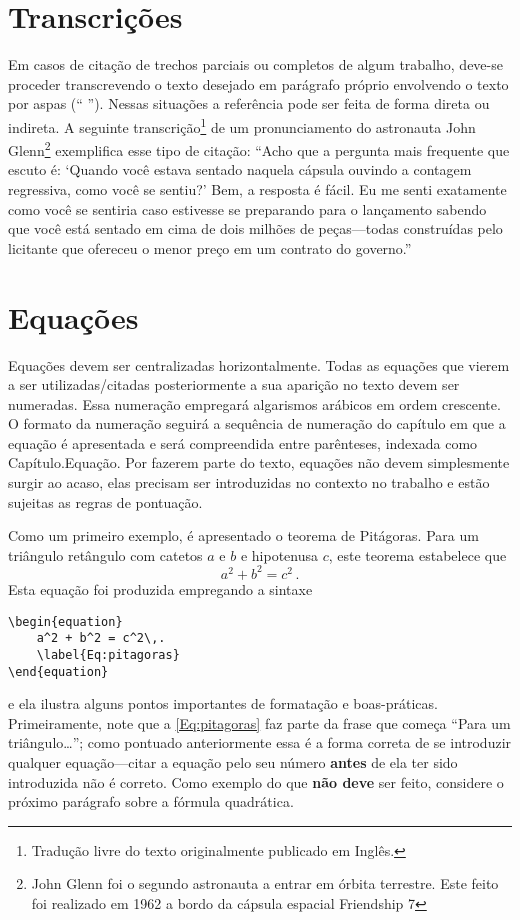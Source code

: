 \section{Transcrições}
Em casos de citação de trechos parciais ou completos de algum trabalho, deve-se proceder transcrevendo o texto desejado em parágrafo próprio envolvendo o texto por aspas (`` ''). Nessas situações a referência pode ser feita de forma direta ou indireta. A seguinte transcrição\footnote{Tradução livre do texto originalmente publicado em Inglês.} de um pronunciamento do astronauta John Glenn\footnote{John Glenn foi o segundo astronauta a entrar em órbita terrestre. Este feito foi realizado em 1962 a bordo da cápsula espacial Friendship 7} exemplifica esse tipo de citação:
``Acho que a pergunta mais frequente que escuto é: `Quando você estava sentado naquela cápsula ouvindo a contagem regressiva, como você se sentiu?' Bem, a resposta é fácil. Eu me senti exatamente como você se sentiria caso estivesse se preparando para o lançamento sabendo que você está sentado em cima de dois milhões de peças---todas construídas pelo licitante que ofereceu o menor preço em um contrato do governo.'' \citep{kranz2009failure}

\section{Equações}
Equações devem ser centralizadas horizontalmente. Todas as equações que vierem a ser utilizadas/citadas posteriormente a sua aparição no texto devem ser numeradas. Essa numeração empregará algarismos arábicos em ordem crescente. O formato da numeração seguirá a sequência de numeração do capítulo em que a equação é apresentada e será compreendida entre parênteses, indexada como Capítulo.Equação. Por fazerem parte do texto, equações não devem simplesmente surgir ao acaso, elas precisam ser introduzidas no contexto no trabalho e estão sujeitas as regras de pontuação.

Como um primeiro exemplo, é apresentado o teorema de Pitágoras. Para um triângulo retângulo com catetos $a$ e $b$ e hipotenusa $c$, este teorema estabelece que
\begin{equation}
    a^2 + b^2 = c^2\,.
    \label{Eq:pitagoras}
\end{equation}
Esta equação foi produzida empregando a sintaxe
\begin{lstlisting}
\begin{equation}
    a^2 + b^2 = c^2\,.
    \label{Eq:pitagoras}
\end{equation}
\end{lstlisting}
e ela ilustra alguns pontos importantes de formatação e boas-práticas. Primeiramente, note que a \cref{Eq:pitagoras} faz parte da frase que começa ``Para um triângulo\ldots''; como pontuado anteriormente essa é a forma correta de se introduzir qualquer equação---citar a equação pelo seu número \textbf{antes} de ela ter sido introduzida não é correto. Como exemplo do que \textbf{não deve} ser feito, considere o próximo parágrafo sobre a fórmula quadrática.

